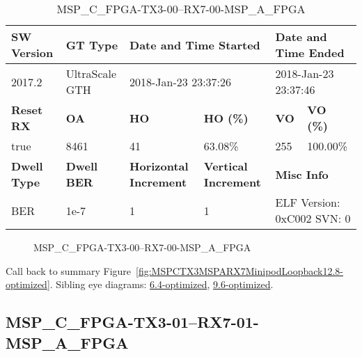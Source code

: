\begin{table}[h]
\centering
\caption{MSP\_C\_FPGA-TX3-00--RX7-00-MSP\_A\_FPGA}
\label{tab:MSPCFPGATX300RX700MSPAFPGA12.8-optimized}
\begin{tabular}{@{}|l|l|l|l|l|l|@{}}
\toprule
\textbf{SW Version}                & \textbf{GT Type}   & \multicolumn{2}{l|}{\textbf{Date and Time Started}}            & \multicolumn{2}{l|}{\textbf{Date and Time Ended}}        \\ \midrule
2017.2                       & UltraScale GTH          & \multicolumn{2}{l|}{2018-Jan-23 23:37:26}                   & \multicolumn{2}{l|}{2018-Jan-23 23:37:46}               \\ \midrule
\textbf{Reset RX}                  & \textbf{OA} & \textbf{HO}   & \textbf{HO (\%)} & \textbf{VO} & \textbf{VO (\%)} \\ \midrule
true & 8461        & 41          & 63.08\%        & 255        & 100.00\%       \\ \midrule
\textbf{Dwell Type}                & \textbf{Dwell BER} & \textbf{Horizontal Increment} & \textbf{Vertical Increment}    & \multicolumn{2}{l|}{\textbf{Misc Info}}                  \\ \midrule
BER                            & 1e-7        & 1        & 1           & \multicolumn{2}{l|}{ELF Version: 0xC002 SVN: 0}                         \\ \bottomrule
\end{tabular}
\end{table}

\begin{figure}[h]
\caption{MSP\_C\_FPGA-TX3-00--RX7-00-MSP\_A\_FPGA} \label{fig:MSPCFPGATX300RX700MSPAFPGA12.8-optimized}
\end{figure}

Call back to summary Figure~\ref{fig:MSPCTX3MSPARX7MinipodLoopback12.8-optimized}.
Sibling eye diagrams: \hyperref[sec:MSPCFPGATX300RX700MSPAFPGA6.4-optimized]{6.4-optimized}, \hyperref[sec:MSPCFPGATX300RX700MSPAFPGA9.6-optimized]{9.6-optimized}.

\clearpage
\newpage


\subsection{MSP\_C\_FPGA-TX3-01--RX7-01-MSP\_A\_FPGA}\label{sec:MSPCFPGATX301RX701MSPAFPGA12.8-optimized}

